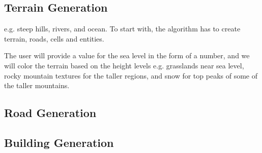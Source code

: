 \subsection{Terrain Generation}

e.g. steep hills, rivers, and ocean.
To start with, the algorithm has to create terrain, roads, cells and entities. 

The user will provide a value for the sea level in the form of a number, and we will color the terrain based on the height levels e.g. grasslands near sea level, rocky mountain textures for the taller regions, and snow for top peaks of some of the taller mountains.

\subsection{Road Generation}
\subsection{Building Generation}
